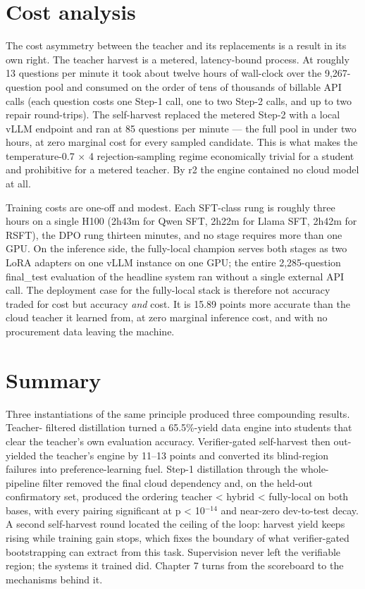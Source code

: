 \documentclass[10pt]{article} %
\begin{document}
\section{Cost analysis}\label{sec:cost-analysis}

The cost asymmetry between the teacher and its replacements is a result in its own right. The
teacher harvest is a metered, latency-bound process. At roughly 13 questions per minute it
took about twelve hours of wall-clock over the 9,267-question pool and consumed on the order
of tens of thousands of billable API calls (each question costs one Step-1 call, one to two
Step-2 calls, and up to two repair round-trips). The self-harvest replaced the metered Step-2
with a local vLLM endpoint and ran at 85 questions per minute --- the full pool in under two
hours, at zero marginal cost for every sampled candidate. This is what makes the
temperature-0.7 $\times$ 4 rejection-sampling regime economically trivial for a student and
prohibitive for a metered teacher. By r2 the engine contained no cloud model at all.

Training costs are one-off and modest. Each SFT-class rung is roughly three hours on a single
H100 (2h43m for Qwen SFT, 2h22m for Llama SFT, 2h42m for RSFT), the DPO rung thirteen minutes,
and no stage requires more than one GPU. On the inference side, the fully-local champion
serves both stages as two LoRA adapters on one vLLM instance on one GPU; the entire
2,285-question final\_test evaluation of the headline system ran without a single external API
call. The deployment case for the fully-local stack is therefore not accuracy traded for cost
but accuracy \emph{and} cost. It is 15.89 points more accurate than the cloud teacher it learned
from, at zero marginal inference cost, and with no procurement data leaving the machine.

\section{Summary}\label{sec:summary}

Three instantiations of the same principle produced three compounding results. Teacher-
filtered distillation turned a 65.5\%-yield data engine into students that clear the teacher's
own evaluation accuracy. Verifier-gated self-harvest then out-yielded the teacher's engine by
11--13 points and converted its blind-region failures into preference-learning fuel. Step-1
distillation through the whole-pipeline filter removed the final cloud dependency and, on the
held-out confirmatory set, produced the ordering teacher < hybrid < fully-local on both bases,
with every pairing significant at p < 10$^{-14}$ and near-zero dev-to-test decay. A second
self-harvest round located the ceiling of the loop: harvest yield keeps rising while training
gain stops, which fixes the boundary of what verifier-gated bootstrapping can extract from
this task. Supervision never left the verifiable region; the systems it trained did. Chapter 7
turns from the scoreboard to the mechanisms behind it.
\end{document}
